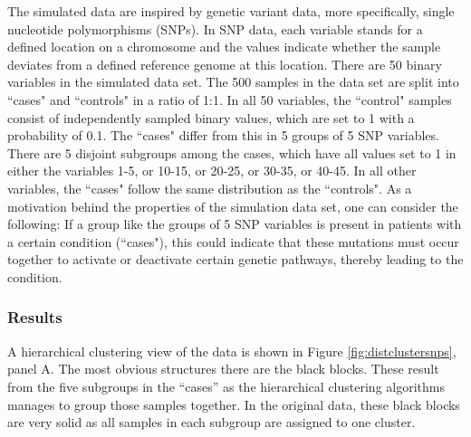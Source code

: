 \documentclass[12pt]{article}
\begin{document}
The simulated data are inspired by genetic variant data, more specifically, single nucleotide polymorphisms (SNPs).
In SNP data, each variable stands for a defined location on a chromosome and the values indicate whether the sample deviates from a defined reference genome at this location.
There are 50 binary variables in the simulated data set.
The 500 samples in the data set are split into ``cases" and ``controls" in a ratio of 1:1.
In all 50 variables, the ``control" samples consist of independently sampled binary values, which are set to 1 with a probability of 0.1.
The ``cases" differ from this in 5 groups of 5 SNP variables.
There are 5 disjoint subgroups among the cases, which have all values set to 1 in either the variables 1-5, or 10-15, or 20-25, or 30-35, or 40-45.
In all other variables, the ``cases" follow the same distribution as the ``controls".
As a motivation behind the properties of the simulation data set, one can consider the following:
If a group like the groups of 5 SNP variables is present in patients with a certain condition (``cases"), this could indicate that these mutations must occur together to activate or deactivate certain genetic pathways, thereby leading to the condition.


\subsubsection{Results}\label{simuexpresults}

A hierarchical clustering view of the data is shown in Figure \ref{fig:distclustersnps}, panel A.
The most obvious structures there are the black blocks.
These result from the five subgroups in the ``cases'' as the hierarchical clustering algorithms manages to group those samples together.
In the original data, these black blocks are very solid as all samples in each subgroup are assigned to one cluster.
\end{document}
